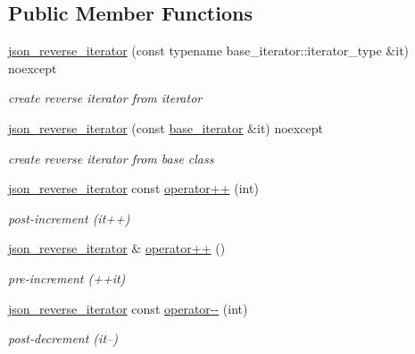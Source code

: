 \subsection*{Public Member Functions}
\begin{DoxyCompactItemize}
\item 
\mbox{\hyperlink{classnlohmann_1_1detail_1_1json__reverse__iterator_a0246de16ece16293f2917dfa5d96e278}{json\+\_\+reverse\+\_\+iterator}} (const typename base\+\_\+iterator\+::iterator\+\_\+type \&it) noexcept
\begin{DoxyCompactList}\small\item\em create reverse iterator from iterator \end{DoxyCompactList}\item 
\mbox{\hyperlink{classnlohmann_1_1detail_1_1json__reverse__iterator_a6c2d025530114ed989188e8adfc8467e}{json\+\_\+reverse\+\_\+iterator}} (const \mbox{\hyperlink{classnlohmann_1_1detail_1_1json__reverse__iterator_a6b2ef1d632fe49bfcc22fbd1abd62395}{base\+\_\+iterator}} \&it) noexcept
\begin{DoxyCompactList}\small\item\em create reverse iterator from base class \end{DoxyCompactList}\item 
\mbox{\hyperlink{classnlohmann_1_1detail_1_1json__reverse__iterator}{json\+\_\+reverse\+\_\+iterator}} const \mbox{\hyperlink{classnlohmann_1_1detail_1_1json__reverse__iterator_aada9d2b320002ef870c5283cda2c1e9d}{operator++}} (int)
\begin{DoxyCompactList}\small\item\em post-\/increment (it++) \end{DoxyCompactList}\item 
\mbox{\hyperlink{classnlohmann_1_1detail_1_1json__reverse__iterator}{json\+\_\+reverse\+\_\+iterator}} \& \mbox{\hyperlink{classnlohmann_1_1detail_1_1json__reverse__iterator_a26caf0069a50ce4ecb010a1453e883fc}{operator++}} ()
\begin{DoxyCompactList}\small\item\em pre-\/increment (++it) \end{DoxyCompactList}\item 
\mbox{\hyperlink{classnlohmann_1_1detail_1_1json__reverse__iterator}{json\+\_\+reverse\+\_\+iterator}} const \mbox{\hyperlink{classnlohmann_1_1detail_1_1json__reverse__iterator_a2c170f51371538da2c8f4094305da3d3}{operator-\/-\/}} (int)
\begin{DoxyCompactList}\small\item\em post-\/decrement (it--) \end{DoxyCompactList}\item 

\end{DoxyCompactItemize}
